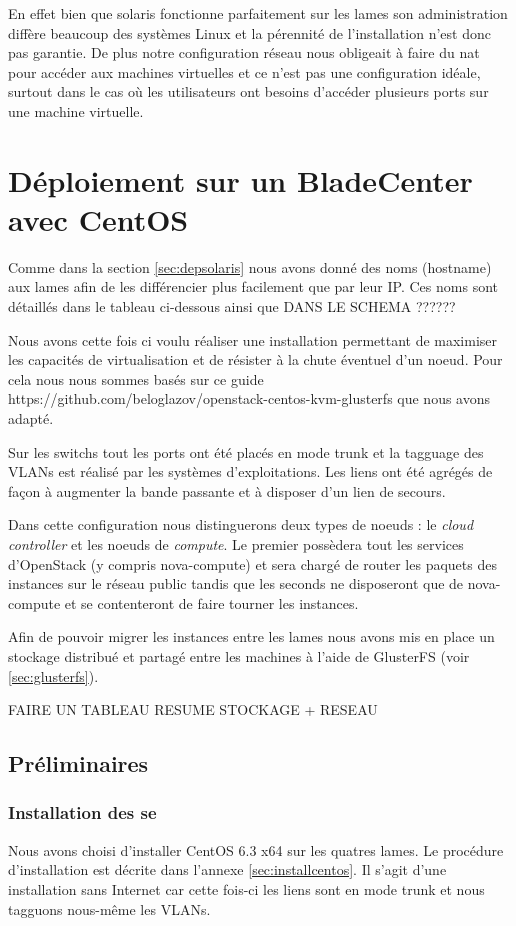 \documentclass[a4paper,oneside]{report}
\begin{document}
En effet bien que \gls{solaris} fonctionne parfaitement sur les lames son administration diffère beaucoup des systèmes Linux et la pérennité de l'installation n'est donc pas garantie.\newline
De plus notre configuration réseau nous obligeait à faire du \gls{nat} pour accéder aux machines virtuelles et ce n'est pas une configuration idéale, surtout dans le cas où les utilisateurs ont besoins d'accéder plusieurs ports sur une machine virtuelle.


\section{Déploiement sur un BladeCenter avec CentOS}
Comme dans la section \ref{sec:depsolaris} nous avons donné des noms (hostname) aux lames afin de les différencier plus facilement que par leur IP.
Ces noms sont détaillés dans le tableau ci-dessous ainsi que DANS LE SCHEMA ??????

Nous avons cette fois ci voulu réaliser une installation permettant de maximiser les capacités de virtualisation et de résister à la chute éventuel d'un noeud.
Pour cela nous nous sommes basés sur ce guide https://github.com/beloglazov/openstack-centos-kvm-glusterfs que nous avons adapté.

Sur les \glspl{switch} tout les ports ont été placés en mode trunk et la tagguage des VLANs est réalisé par les systèmes d'exploitations. Les liens ont été agrégés de façon à augmenter la bande passante et à disposer d'un lien de secours.

Dans cette configuration nous distinguerons deux types de noeuds : le \emph{cloud controller} et les noeuds de \emph{compute}. Le premier possèdera tout les services d'OpenStack (y compris nova-compute) et sera chargé de router les paquets des instances sur le réseau public tandis que les seconds ne disposeront que de nova-compute et se contenteront de faire tourner les instances.

Afin de pouvoir migrer les instances entre les lames nous avons mis en place un stockage distribué et partagé entre les machines à l'aide de GlusterFS (voir \ref{sec:glusterfs}).


FAIRE UN TABLEAU RESUME STOCKAGE + RESEAU

\subsection{Préliminaires}
\subsubsection{Installation des \gls{se}}
Nous avons choisi d'installer CentOS 6.3 x64 sur les quatres lames. Le procédure d'installation est décrite dans l'annexe \ref{sec:installcentos}.\newline
Il s'agit d'une installation sans Internet car cette fois-ci les liens sont en mode trunk et nous tagguons nous-même les VLANs.
\end{document}
